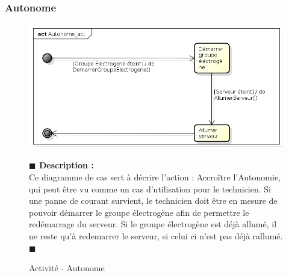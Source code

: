 \documentclass[11pt, titlepage]{report}
\newcommand{\debutDescription}{\noindent\textbf{\textcolor{DescriptionColor}{$\blacksquare$  Description : \\}}}
\newcommand{\finDescription}{\noindent\textcolor{DescriptionColor}{$\blacksquare$}}
\begin{document}
\subsubsection{Autonome}
\begin{figure}[h!]
\begin{center}
\includegraphics[scale=.4]{../images/diagrammes/sysml/activite/autonome.png} 
\caption{Activité - Autonome}
\end{center}
\debutDescription
Ce diagramme de cas sert à décrire l'action : Accroître l'Autonomie, qui peut être vu comme un cas d'utilisation pour le technicien. Si une panne de courant survient, le technicien doit être en mesure de pouvoir démarrer le groupe électrogène afin de permettre le redémarrage du serveur. Si le groupe électrogène est déjà allumé, il ne reste qu'à redemarrer le serveur, si celui ci n'est pas déjà rallumé.
\finDescription
\end{figure}
\end{document}

